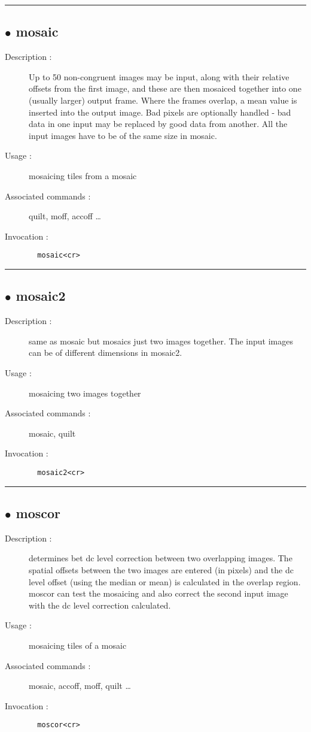 \hrule \subsection*{$\bullet$ mosaic}
\begin{description}
\item[Description :] Up to 50 non-congruent images may be input, along with their
relative offsets from the first image, and these are then mosaiced
together into one (usually larger) output frame. Where the frames
overlap, a mean value is inserted into the output image. Bad pixels are
optionally handled - bad data in one input may be replaced by good data
from another.  All the input images have to be of the same size in
mosaic.
\item[Usage :] mosaicing tiles from a mosaic
\item[Associated commands :] quilt, moff, accoff \ldots 
\item[Invocation :]

\verb+  mosaic<cr> +\end{description}

\hrule \subsection*{$\bullet$ mosaic2}
\begin{description}
\item[Description :] same as mosaic but mosaics just two images together.  The input
images can be of different dimensions in mosaic2.
\item[Usage :] mosaicing two images together
\item[Associated commands :] mosaic, quilt
\item[Invocation :]

\verb+  mosaic2<cr> +\end{description}

\hrule \subsection*{$\bullet$ moscor}
\begin{description}
\item[Description :] determines bet dc level correction between two overlapping
images. The spatial offsets between the two images are entered (in
pixels) and the dc level offset (using the median or mean) is calculated
in the overlap region.  moscor can test the mosaicing and also correct
the second input image with the dc level correction calculated.
\item[Usage :] mosaicing tiles of a mosaic
\item[Associated commands :] mosaic, accoff, moff, quilt \ldots
\item[Invocation :]

\verb+  moscor<cr> +\end{description}

